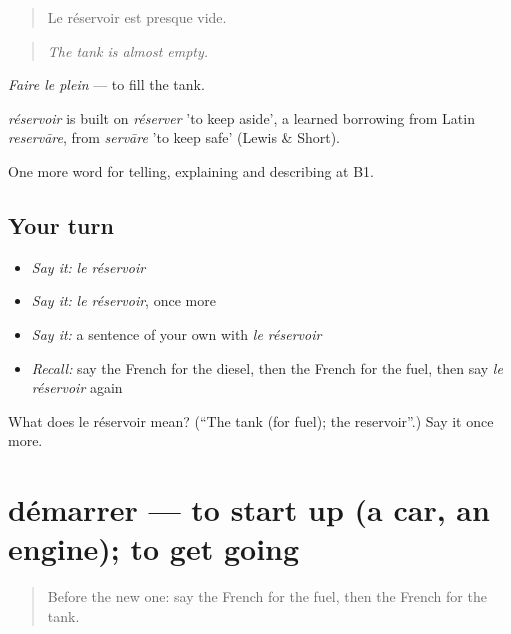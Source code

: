 \begin{quote}
Le réservoir est presque vide.
\end{quote}

\begin{quote}
\emph{The tank is almost empty.}
\end{quote}

\emph{Faire le plein} — to fill the tank.

\begin{cousinweb}
\emph{réservoir} is built on \emph{réserver} 'to keep aside', a learned borrowing from Latin \emph{reservāre}, from \emph{servāre} 'to keep safe' (Lewis \& Short).
\end{cousinweb}

\begin{grammarlens}[title={What you've built}]
One more word for telling, explaining and describing at B1.
\end{grammarlens}

\subsection*{Your turn}
\begin{itemize}
\raggedright
  \item \emph{Say it:} \emph{le réservoir}
  \item \emph{Say it:} \emph{le réservoir}, once more
  \item \emph{Say it:} a sentence of your own with \emph{le réservoir}
  \item \emph{Recall:} say the French for the diesel, then the French for the fuel, then say \emph{le réservoir} again
\end{itemize}

\begin{tcolorbox}[breakable,colback=teal!4,colframe=teal!35!black,title={Before you move on}]
What does le réservoir mean? (\textquotedblleft{}The tank (for fuel); the reservoir\textquotedblright{}.) Say it once more.
\end{tcolorbox}
\section[démarrer]{démarrer — to start up (a car, an engine); to get going}

\label{lesson:FR-C403-demarrer}



\begin{quote}
Before the new one: say the French for the fuel, then the French for the tank.
\end{quote}

